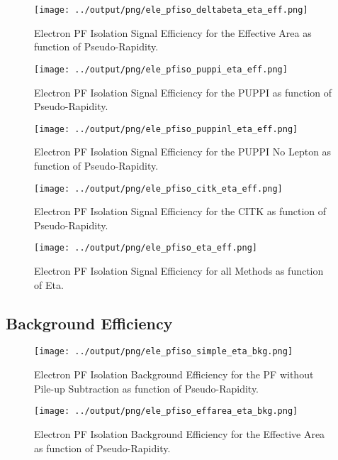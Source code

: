 \documentclass[11pt]{book}
\begin{document}
\begin{figure}[htb]
\centering
\texttt{[image: ../output/png/ele\_pfiso\_deltabeta\_eta\_eff.png]}
\caption{Electron PF Isolation Signal Efficiency for the Effective Area as function of Pseudo-Rapidity.}
\label{fig:ele_pfiso_eta_eff_deltabeta}
\end{figure}

\begin{figure}[htb]
\centering
\texttt{[image: ../output/png/ele\_pfiso\_puppi\_eta\_eff.png]}
\caption{Electron PF Isolation Signal Efficiency for the PUPPI as function of Pseudo-Rapidity.}
\label{fig:ele_pfiso_eta_eff_puppi}
\end{figure}

\begin{figure}[htb]
\centering
\texttt{[image: ../output/png/ele\_pfiso\_puppinl\_eta\_eff.png]}
\caption{Electron PF Isolation Signal Efficiency for the PUPPI No Lepton as function of Pseudo-Rapidity.}
\label{fig:ele_pfiso_eta_eff_puppinl}
\end{figure}

\begin{figure}[htb]
\centering
\texttt{[image: ../output/png/ele\_pfiso\_citk\_eta\_eff.png]}
\caption{Electron PF Isolation Signal Efficiency for the CITK as function of Pseudo-Rapidity.}
\label{fig:ele_pfiso_eta_eff_citk}
\end{figure}

\begin{figure}[htb]
\centering
\texttt{[image: ../output/png/ele\_pfiso\_eta\_eff.png]}
\caption{Electron PF Isolation Signal Efficiency for all Methods as function of Eta.}
\label{fig:ele_pfiso_eta_eff}
\end{figure}
\clearpage

\subsection{Background Efficiency}
\begin{figure}[htb]
\centering
\texttt{[image: ../output/png/ele\_pfiso\_simple\_eta\_bkg.png]}
\caption{Electron PF Isolation Background Efficiency for the PF without Pile-up Subtraction as function of Pseudo-Rapidity.}
\label{fig:ele_pfiso_eta_bkg_simple}
\end{figure}

\begin{figure}[htb]
\centering
\texttt{[image: ../output/png/ele\_pfiso\_effarea\_eta\_bkg.png]}
\caption{Electron PF Isolation Background Efficiency for the Effective Area as function of Pseudo-Rapidity.}
\label{fig:ele_pfiso_eta_bkg_effarea}
\end{figure}
\end{document}
